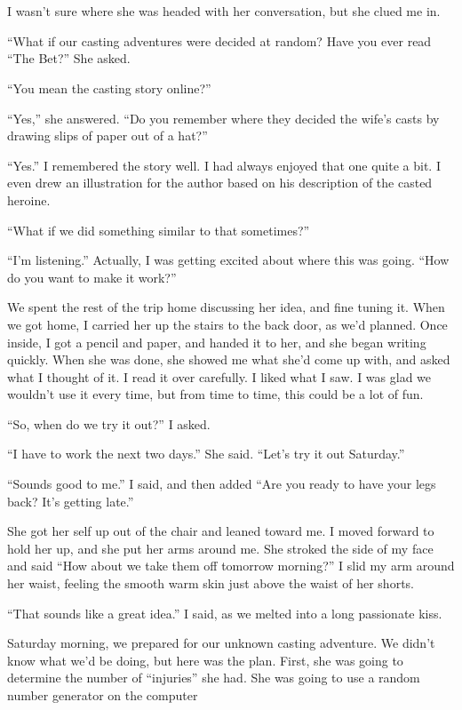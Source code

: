 \chapter{}
I wasn't sure where she was headed with her conversation, but she clued me in.

``What if our casting adventures were decided at random? Have you ever read ``The Bet?'' She
asked.

``You mean the casting story online?''

``Yes,'' she answered. ``Do you remember where they decided the wife's casts by drawing slips
of paper out of a hat?''

``Yes.'' I remembered the story well. I had always enjoyed that one quite a bit. I even drew
an illustration for the author based on his description of the casted heroine.

``What if we did something similar to that sometimes?''

``I'm listening.'' Actually, I was getting excited about where this was going. ``How do you
want to make it work?''

We spent the rest of the trip home discussing her idea, and fine tuning it. When we got
home, I carried her up the stairs to the back door, as we'd planned. Once inside, I got a pencil
and paper, and handed it to her, and she began writing quickly. When she was done, she showed me
what she'd come up with, and asked what I thought of it. I read it over carefully. I liked what
I saw. I was glad we wouldn't use it every time, but from time to time, this could be a lot of
fun.

``So, when do we try it out?'' I asked.

``I have to work the next two days.'' She said. ``Let's try it out Saturday.''

``Sounds good to me.'' I said, and then added ``Are you ready to have your legs back? It's
getting late.''

She got her self up out of the chair and leaned toward me. I moved forward to hold her up,
and she put her arms around me. She stroked the side of my face and said ``How about we take
them
off tomorrow morning?'' I slid my arm around her waist, feeling the smooth warm skin just above
the waist of her shorts.

``That sounds like a great idea.'' I said, as we melted into a long passionate kiss.

Saturday morning, we prepared for our unknown casting adventure. We didn't know what we'd
be doing, but here was the plan. First, she was going to determine the number of ``injuries''
she
had. She was going to use a random number generator on the computer

